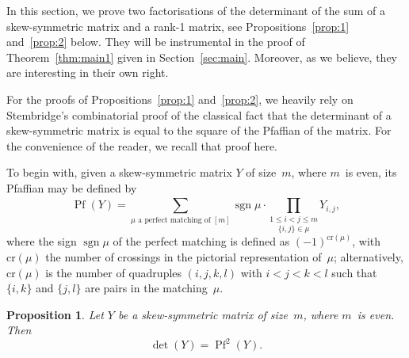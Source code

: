 \documentclass[12pt,reqno]{amsart}
\numberwithin{equation}{section}
\newtheorem{proposition}[theorem]{Proposition}
\theoremstyle{definition}
\theoremstyle{remark}
\def\sgn{\operatorname{sgn}}
\def\Pf{\operatorname{Pf}}
\begin{document}
In this section, we prove two factorisations of the determinant of
the sum of a skew-symmetric matrix and a rank-1 matrix, see
Propositions~\ref{prop:1} and~\ref{prop:2} below. They will
be instrumental in the proof of Theorem~\ref{thm:main1} given in
Section~\ref{sec:main}. Moreover, as we believe, they are interesting
in their own right.

For the proofs of Propositions~\ref{prop:1} and~\ref{prop:2}, 
we heavily rely on Stembridge's combinatorial proof 
\cite[Proof of Prop.~2.2]{StemAE} of the classical fact that
the determinant of a skew-symmetric matrix is equal to the
square of the Pfaffian of the matrix. For the convenience of
the reader, we recall that proof here.

To begin with, given a skew-symmetric matrix $Y$ of size~$m$, where
$m$~is even, its Pfaffian may be defined by
$$
\Pf(Y)=\sum_{\mu\text{ a perfect matching of }[m]}
\sgn\mu\cdot
\underset{\{i,j\}\in\mu}{\prod _{1\le i<j\le m} ^{}}
Y_{i,j},
$$
where the sign $\sgn\mu$ of the perfect matching is defined
as $(-1)^{\text{cr}(\mu)}$, with $\text{cr}(\mu)$ the number
of crossings in the pictorial representation of~$\mu$; alternatively,
$\text{cr}(\mu)$ is the number of quadruples $(i,j,k,l)$ with
$i<j<k<l$ such that $\{i,k\}$ and $\{j,l\}$ are pairs in the
matching~$\mu$. 

\begin{proposition} \label{prop:0}
Let $Y$ be a skew-symmetric matrix of size~$m$, where $m$~is even.
Then
\begin{equation} \label{eq:0} 
\det(Y)=\Pf^2(Y).
\end{equation}
\end{proposition}
\end{document}
